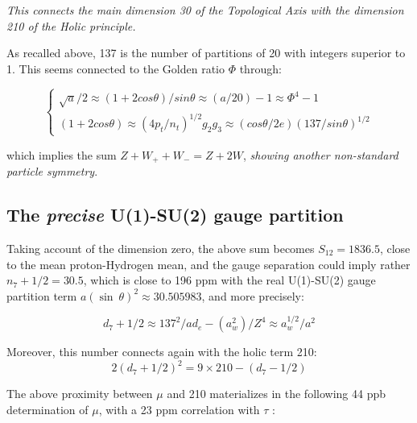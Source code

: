 \documentclass[a4paper,9pt]{article}
\begin{document}
\textit{This connects the main dimension 30 of the Topological Axis with the dimension 210 of the Holic principle.}

As recalled above, 137 is the number of partitions of 20 with integers superior to 1. This seems connected to the Golden ratio $\Phi$ through:

\begin{equation}
 \left\{
    \begin{array}{ll}
          \sqrt a/2 \approx (1+2cos\theta)/sin\theta \approx (a/20) -1 \approx \Phi^4 - 1 \\
           (1+2cos\theta) \approx (4p_t / n_t)^{1/2} g_2 g_3 \approx (cos\theta / 2e)(137/sin\theta)^{1/2}
    \end{array}
\right.
\end{equation}

which implies the sum $Z + W_+ + W_- = Z + 2W$, \textit{showing another non-standard particle symmetry}.



 \subsection{The \textit{precise} U(1)-SU(2) gauge partition}
 Taking account of the dimension zero, the above sum becomes $S_{12} = 1836.5$, close to the mean proton-Hydrogen mean, and the gauge separation could imply rather $n_7+1/2 = 30.5$, which is close to 196 ppm with the real U(1)-SU(2) gauge partition term $a (\sin~\theta)^2\approx 30.505983$, and more precisely:
 
 \begin{equation}
 d_7+1/2 \approx 137^2/ad_e -(a_w^2)/Z^4 \approx a_w^{1/2}/a^2
 \end{equation}
 
Moreover, this number connects again with the holic term 210:
% 
 \begin{equation}
 2(d_7+1/2)^2 = 9\times210 - (d_7-1/2)
 \end{equation}
 
 The above proximity between $\mu$ and 210 materializes in the following 44 ppb determination of $\mu$, with a 23 ppm correlation with $\tau$ : 
 
\end{document}
